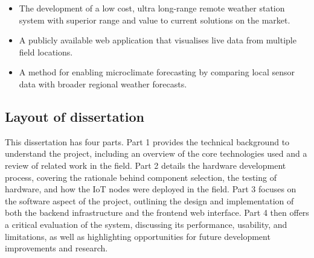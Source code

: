 \begin{itemize}
    \item The development of a low cost, ultra long-range remote weather station
    system with superior range and value to current solutions on the market.
    \item A publicly available web application that visualises live data from
    multiple field locations.
    \item A method for enabling microclimate forecasting by comparing local
    sensor data with broader regional weather forecasts.
\end{itemize}

\subsection{Layout of dissertation}

This dissertation has four parts. Part 1 provides the technical background to
understand the project, including an overview of the core technologies used and
a review of related work in the field. Part 2 details the hardware development
process, covering the rationale behind component selection, the testing of
hardware, and how the IoT nodes were deployed in the field. Part 3 focuses on
the software aspect of the project, outlining the design and implementation of
both the backend infrastructure and the frontend web interface. Part 4 then
offers a critical evaluation of the system, discussing its performance,
usability, and limitations, as well as highlighting opportunities for future
development improvements and research.

